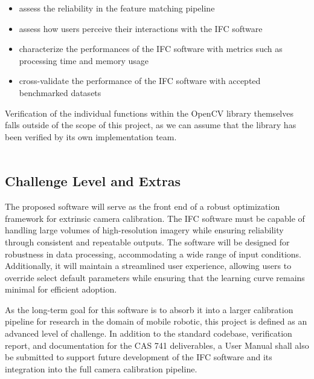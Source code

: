 \documentclass[12pt, titlepage]{article}
\begin{document}
\begin{itemize}
  \item assess the reliability in the feature matching pipeline
  \item assess how users perceive their interactions with the IFC software 
  \item characterize the performances of the IFC software with metrics such as processing time and 
  memory usage
  \item cross-validate the performance of the IFC software with accepted benchmarked datasets
\end{itemize}

Verification of the individual functions within the OpenCV library themselves falls outside of the 
scope of this project, as we can assume that the library has been verified by its own 
implementation team. 
\\ \\

\subsection{Challenge Level and Extras}
The proposed software will serve as the front end of a robust optimization framework 
for extrinsic camera calibration. The IFC software must be capable of handling large volumes of 
high-resolution imagery while ensuring reliability through consistent and repeatable outputs. 
The software will be designed for robustness in data processing, accommodating a wide range of 
input conditions. Additionally, it will maintain a streamlined user experience, allowing users 
to override select default parameters while ensuring that the learning curve remains minimal 
for efficient adoption. 

As the long-term goal for this software is to absorb it into a larger calibration 
pipeline for research in the domain of mobile robotic, this project is defined as 
an advanced level of challenge. In addition to the standard codebase, verification 
report, and documentation for the CAS 741 deliverables, a User Manual shall also be 
submitted to support future development of the IFC software and its integration into 
the full camera calibration pipeline.

\end{document}
